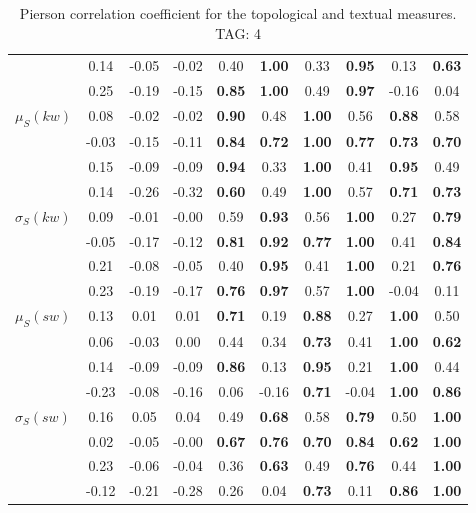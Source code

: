\begin{table*}[h!]
\begin{center}
\begin{tabular}{| l || c | c | c | c | c | c | c | c | c |}
 & 0.14 & -0.05 & -0.02 & 0.40 & {\bf 1.00} & 0.33 & {\bf 0.95} & 0.13 & {\bf 0.63} \\
 & 0.25 & -0.19 & -0.15 & {\bf 0.85} & {\bf 1.00} & 0.49 & {\bf 0.97} & -0.16 & 0.04 \\\hline
$\mu_S(kw)$ & 0.08 & -0.02 & -0.02 & {\bf 0.90} & 0.48 & {\bf 1.00} & 0.56 & {\bf 0.88} & 0.58 \\
 & -0.03 & -0.15 & -0.11 & {\bf 0.84} & {\bf 0.72} & {\bf 1.00} & {\bf 0.77} & {\bf 0.73} & {\bf 0.70} \\
 & 0.15 & -0.09 & -0.09 & {\bf 0.94} & 0.33 & {\bf 1.00} & 0.41 & {\bf 0.95} & 0.49 \\
 & 0.14 & -0.26 & -0.32 & {\bf 0.60} & 0.49 & {\bf 1.00} & 0.57 & {\bf 0.71} & {\bf 0.73} \\\hline
$\sigma_S(kw)$ & 0.09 & -0.01 & -0.00 & 0.59 & {\bf 0.93} & 0.56 & {\bf 1.00} & 0.27 & {\bf 0.79} \\
 & -0.05 & -0.17 & -0.12 & {\bf 0.81} & {\bf 0.92} & {\bf 0.77} & {\bf 1.00} & 0.41 & {\bf 0.84} \\
 & 0.21 & -0.08 & -0.05 & 0.40 & {\bf 0.95} & 0.41 & {\bf 1.00} & 0.21 & {\bf 0.76} \\
 & 0.23 & -0.19 & -0.17 & {\bf 0.76} & {\bf 0.97} & 0.57 & {\bf 1.00} & -0.04 & 0.11 \\\hline
$\mu_S(sw)$ & 0.13 & 0.01 & 0.01 & {\bf 0.71} & 0.19 & {\bf 0.88} & 0.27 & {\bf 1.00} & 0.50 \\
 & 0.06 & -0.03 & 0.00 & 0.44 & 0.34 & {\bf 0.73} & 0.41 & {\bf 1.00} & {\bf 0.62} \\
 & 0.14 & -0.09 & -0.09 & {\bf 0.86} & 0.13 & {\bf 0.95} & 0.21 & {\bf 1.00} & 0.44 \\
 & -0.23 & -0.08 & -0.16 & 0.06 & -0.16 & {\bf 0.71} & -0.04 & {\bf 1.00} & {\bf 0.86} \\\hline
$\sigma_S(sw)$ & 0.16 & 0.05 & 0.04 & 0.49 & {\bf 0.68} & 0.58 & {\bf 0.79} & 0.50 & {\bf 1.00} \\
 & 0.02 & -0.05 & -0.00 & {\bf 0.67} & {\bf 0.76} & {\bf 0.70} & {\bf 0.84} & {\bf 0.62} & {\bf 1.00} \\
 & 0.23 & -0.06 & -0.04 & 0.36 & {\bf 0.63} & 0.49 & {\bf 0.76} & 0.44 & {\bf 1.00} \\
 & -0.12 & -0.21 & -0.28 & 0.26 & 0.04 & {\bf 0.73} & 0.11 & {\bf 0.86} & {\bf 1.00} \\\hline
\end{tabular}
\caption{Pierson correlation coefficient for the topological and textual measures. TAG: 4}
\end{center}
\end{table*}